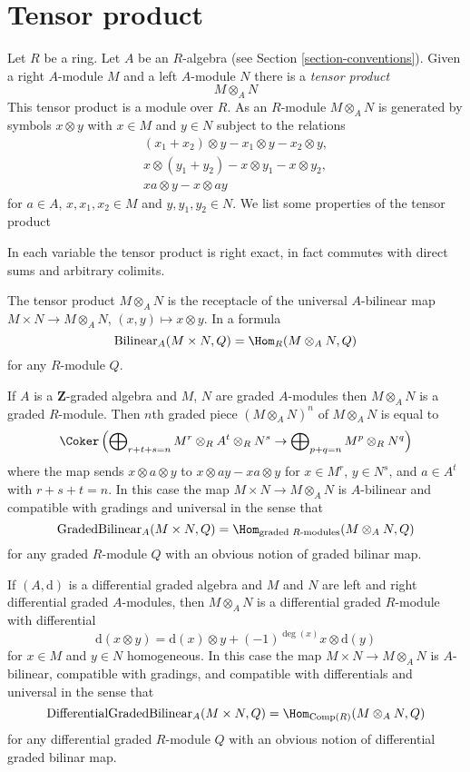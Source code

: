 \section{Tensor product}
\label{section-tensor-product}

\noindent
Let $R$ be a ring. Let $A$ be an $R$-algebra (see
Section \ref{section-conventions}). Given a right $A$-module $M$
and a left $A$-module $N$ there is a {\it tensor product}
$$
M \otimes_A N
$$
This tensor product is a module over $R$. As an $R$-module $M \otimes_A N$
is generated by symbols $x \otimes y$ with $x \in M$ and $y \in N$ subject
to the relations
$$
\begin{matrix}
(x_1 + x_2) \otimes y - x_1 \otimes y - x_2 \otimes y, \\
x \otimes (y_1 + y_2) - x \otimes y_1 - x \otimes y_2, \\
xa \otimes y - x \otimes ay
\end{matrix}
$$
for $a \in A$, $x, x_1, x_2 \in M$ and $y, y_1, y_2 \in N$.
We list some properties of the tensor product

\medskip\noindent
In each variable the tensor product is right exact, in fact commutes
with direct sums and arbitrary colimits.

\medskip\noindent
The tensor product $M \otimes_A N$ is the receptacle of the universal
$A$-bilinear map $M \times N \to M \otimes_A N$, $(x, y) \mapsto x \otimes y$.
In a formula
$$
\text{Bilinear}_A(M \times N, Q) = \Hom_R(M \otimes_A N, Q)
$$
for any $R$-module $Q$.

\medskip\noindent
If $A$ is a $\mathbf{Z}$-graded algebra and $M$, $N$ are graded
$A$-modules then $M \otimes_A N$ is a graded $R$-module.
Then $n$th graded piece $(M \otimes_A N)^n$ of $M \otimes_A N$
is equal to
$$
\Coker\left(
\bigoplus\nolimits_{r + t + s = n}
M^r \otimes_R A^t \otimes_R N^s \to
\bigoplus\nolimits_{p + q = n} M^p \otimes_R N^q
\right)
$$
where the map sends $x \otimes a \otimes y$ to
$x \otimes ay - xa \otimes y$ for
$x \in M^r$, $y \in N^s$, and $a \in A^t$ with $r + s + t = n$.
In this case the map $M \times N \to M \otimes_A N$ is $A$-bilinear
and compatible with gradings and universal in the sense that
$$
\text{GradedBilinear}_A(M \times N, Q) =
\Hom_{\text{graded }R\text{-modules}}(M \otimes_A N, Q)
$$
for any graded $R$-module $Q$ with an obvious notion of graded
bilinar map.

\medskip\noindent
If $(A, \text{d})$ is a differential graded algebra and
$M$ and $N$ are left and right differential graded $A$-modules, then
$M \otimes_A N$ is a differential graded $R$-module with differential
$$
\text{d}(x \otimes y) =
\text{d}(x) \otimes y + (-1)^{\deg(x)}x \otimes \text{d}(y)
$$
for $x \in M$ and $y \in N$ homogeneous. In this case the map
$M \times N \to M \otimes_A N$ is $A$-bilinear, compatible with gradings,
and compatible with differentials and universal in the sense that
$$
\text{DifferentialGradedBilinear}_A(M \times N, Q) =
\Hom_{\text{Comp}(R)}(M \otimes_A N, Q)
$$
for any differential graded $R$-module $Q$ with an obvious notion of
differential graded bilinar map.






